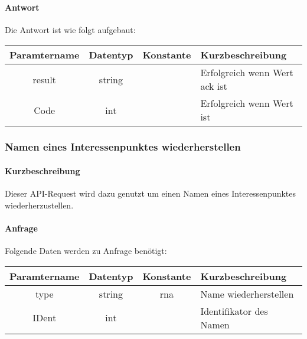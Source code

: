 \paragraph{Antwort}Die Antwort ist wie folgt aufgebaut:
\begin{table}[H]
	\begin{tabular}{|c|c|c|p{6.5cm}|}
		\hline
		\textbf{Paramtername} & \textbf{Datentyp} & \textbf{Konstante} & \textbf{Kurzbeschreibung}                                                                                               \\ \hline
		result              & string           &                 & Erfolgreich wenn Wert {\glqq ack\grqq} ist \\ \hline
		Code                & int              &                 & Erfolgreich wenn Wert {\glqq 0\grqq} ist \\ \hline
	\end{tabular}
\end{table}
\subsubsection{Namen eines Interessenpunktes wiederherstellen}
\paragraph{Kurzbeschreibung}Dieser API-Request wird dazu genutzt um einen Namen eines Interessenpunktes wiederherzustellen.
\paragraph{Anfrage}Folgende Daten werden zu Anfrage benötigt:
\begin{table}[H]
	\begin{tabular}{|c|c|c|p{6.5cm}|}
		\hline
		\textbf{Paramtername} & \textbf{Datentyp} & \textbf{Konstante} & \textbf{Kurzbeschreibung}                                                                                               \\ \hline
		type                & string            & rna                & Name wiederherstellen \\ \hline
		IDent               & int               &                    & Identifikator des Namen \\ \hline
	\end{tabular}
\end{table}
